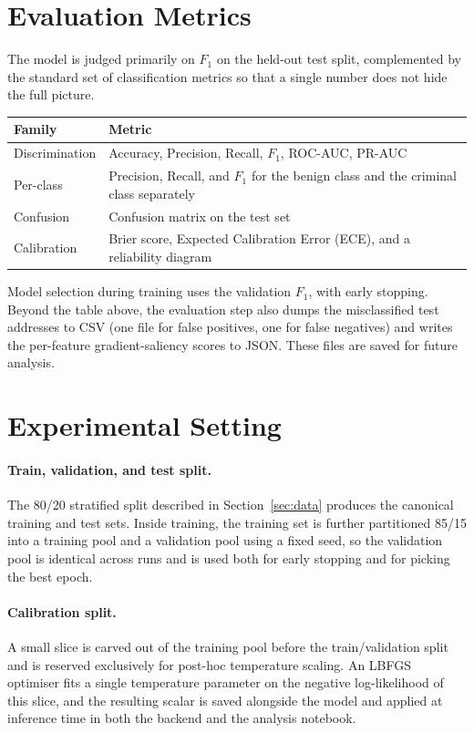 \documentclass[11pt]{article}
\begin{document}
\section{Evaluation Metrics}

The model is judged primarily on $F_1$ on the held-out test split, complemented by the standard set of
classification metrics so that a single number does not hide the full picture.

\begin{table}[h]
\centering\small
\begin{tabularx}{\linewidth}{l Y}
\toprule
\textbf{Family} & \textbf{Metric} \\
\midrule
Discrimination     & Accuracy, Precision, Recall, $F_1$, ROC-AUC, PR-AUC \\
Per-class          & Precision, Recall, and $F_1$ for the benign class and the criminal class separately \\
Confusion          & Confusion matrix on the test set \\
Calibration        & Brier score, Expected Calibration Error (ECE), and a reliability diagram \\
\bottomrule
\end{tabularx}
\end{table}

\noindent Model selection during training uses the validation $F_1$, with early stopping. Beyond the table above,
the evaluation step also dumps the misclassified test addresses to CSV (one file for false positives, one for
false negatives) and writes the per-feature gradient-saliency scores to JSON. These files are saved for future
analysis.

\section{Experimental Setting}

\paragraph{Train, validation, and test split.}
The 80/20 stratified split described in Section~\ref{sec:data} produces the canonical training and test sets.
Inside training, the training set is further partitioned 85/15 into a training pool and a validation pool using a
fixed seed, so the validation pool is identical across runs and is used both for early stopping and for picking
the best epoch.

\paragraph{Calibration split.}
A small slice is carved out of the training pool before the train/validation split and is reserved exclusively for
post-hoc temperature scaling. An LBFGS optimiser fits a single temperature parameter on the negative log-likelihood
of this slice, and the resulting scalar is saved alongside the model and applied at inference time in both the
backend and the analysis notebook.
\end{document}
